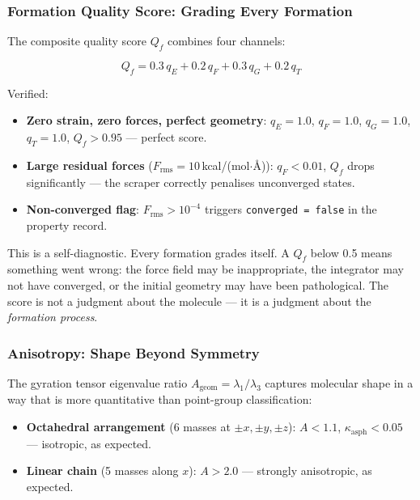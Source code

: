 \documentclass[11pt, a4paper, oneside]{article}
\theoremstyle{definition}
\theoremstyle{remark}
\begin{document}
\subsubsection{Formation Quality Score: Grading Every Formation}

The composite quality score $Q_f$ combines four channels:

\begin{equation}
Q_f = 0.3\, q_E + 0.2\, q_F + 0.3\, q_G + 0.2\, q_T
\end{equation}

Verified:
\begin{itemize}
  \item \textbf{Zero strain, zero forces, perfect geometry}:
        $q_E = 1.0$, $q_F = 1.0$, $q_G = 1.0$, $q_T = 1.0$,
        $Q_f > 0.95$ — perfect score.
  \item \textbf{Large residual forces} ($F_{\text{rms}} = 10$\,kcal/(mol$\cdot$\AA)):
        $q_F < 0.01$, $Q_f$ drops significantly — the scraper correctly
        penalises unconverged states.
  \item \textbf{Non-converged flag}: $F_{\text{rms}} > 10^{-4}$ triggers
        \texttt{converged = false} in the property record.
\end{itemize}

This is a self-diagnostic.  Every formation grades itself.  A $Q_f$
below 0.5 means something went wrong: the force field may be
inappropriate, the integrator may not have converged, or the initial
geometry may have been pathological.  The score is not a judgment
about the molecule — it is a judgment about the \textit{formation
process}.

\subsubsection{Anisotropy: Shape Beyond Symmetry}

The gyration tensor eigenvalue ratio $A_{\text{geom}} = \lambda_1 / \lambda_3$
captures molecular shape in a way that is more quantitative than
point-group classification:

\begin{itemize}
  \item \textbf{Octahedral arrangement} (6 masses at $\pm x, \pm y, \pm z$):
        $A < 1.1$, $\kappa_{\text{asph}} < 0.05$ — isotropic, as expected.
  \item \textbf{Linear chain} (5 masses along $x$):
        $A > 2.0$ — strongly anisotropic, as expected.
\end{itemize}
\end{document}
